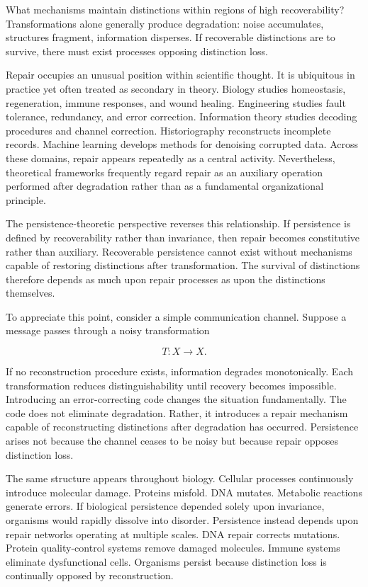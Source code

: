 \documentclass[12pt,oneside]{article}
\theoremstyle{definition}
\begin{document}
What mechanisms maintain distinctions within regions of high recoverability? Transformations alone generally produce degradation: noise accumulates, structures fragment, information disperses. If recoverable distinctions are to survive, there must exist processes opposing distinction loss.

Repair occupies an unusual position within scientific thought. It is ubiquitous in practice yet often treated as secondary in theory. Biology studies homeostasis, regeneration, immune responses, and wound healing. Engineering studies fault tolerance, redundancy, and error correction. Information theory studies decoding procedures and channel correction. Historiography reconstructs incomplete records. Machine learning develops methods for denoising corrupted data. Across these domains, repair appears repeatedly as a central activity. Nevertheless, theoretical frameworks frequently regard repair as an auxiliary operation performed after degradation rather than as a fundamental organizational principle.

The persistence-theoretic perspective reverses this relationship. If persistence is defined by recoverability rather than invariance, then repair becomes constitutive rather than auxiliary. Recoverable persistence cannot exist without mechanisms capable of restoring distinctions after transformation. The survival of distinctions therefore depends as much upon repair processes as upon the distinctions themselves.

To appreciate this point, consider a simple communication channel. Suppose a message passes through a noisy transformation

\[
T:X\rightarrow X.
\]

If no reconstruction procedure exists, information degrades monotonically. Each transformation reduces distinguishability until recovery becomes impossible. Introducing an error-correcting code changes the situation fundamentally. The code does not eliminate degradation. Rather, it introduces a repair mechanism capable of reconstructing distinctions after degradation has occurred. Persistence arises not because the channel ceases to be noisy but because repair opposes distinction loss.

The same structure appears throughout biology. Cellular processes continuously introduce molecular damage. Proteins misfold. DNA mutates. Metabolic reactions generate errors. If biological persistence depended solely upon invariance, organisms would rapidly dissolve into disorder. Persistence instead depends upon repair networks operating at multiple scales. DNA repair corrects mutations. Protein quality-control systems remove damaged molecules. Immune systems eliminate dysfunctional cells. Organisms persist because distinction loss is continually opposed by reconstruction.
\end{document}
